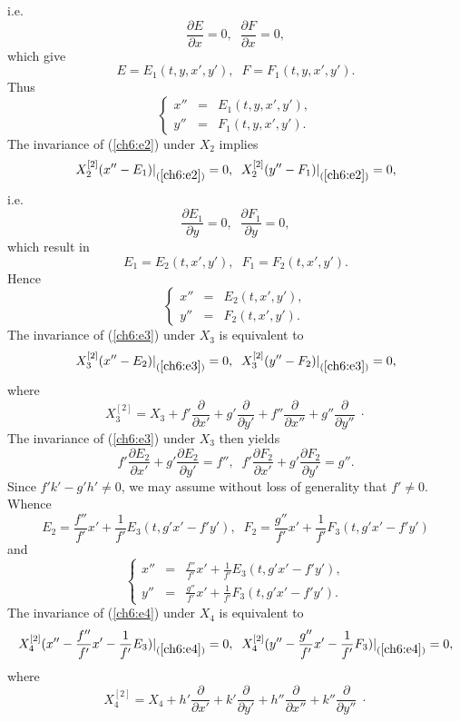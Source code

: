 i.e.
\[\frac{\partial E}{\partial x}=0,\;\;\frac{\partial F}{\partial x}=0,\]
which give
\[E=E_1(t,y,x',y'),\;\;F=F_1(t,y,x',y').\]
Thus
\begin{equation}
\label{ch6:e2}
\left \{ \begin{array}{ccc} x'' &=&E_1(t,y,x',y'),\\ y''&=&F_1(t,y,x',y'). 
\end{array} \right.
\end{equation}
The invariance of (\ref{ch6:e2}) under $X_2$ implies
\[X_2^{[2]}(x''-E_1)|_{(\ref{ch6:e2})}=0,\;\;X_2^{[2]}(y''-F_1)|_{(\ref{ch6:e2})}=0,\]
i.e.
\[\frac{\partial E_1}{\partial y}=0,\;\;\frac{\partial F_1}{\partial y}=0,\] 
which result in
\[E_1=E_2(t,x',y'),\;\;F_1=F_2(t,x',y').\]
Hence
\begin{equation}
\label{ch6:e3}
\left \{ \begin{array}{ccc} x'' &=&E_2(t,x',y'), \\ y''&=&F_2(t,x',y'). 
\end{array} \right.
\end{equation}
The invariance of (\ref{ch6:e3}) under $X_3$ is equivalent to
\[X_3^{[2]}(x''-E_2)|_{(\ref{ch6:e3})}=0,\;\;X_3^{[2]}(y''-F_2)|_{(\ref{ch6:e3})}=0,\]
where
\[X_3^{[2]}=X_3+f'\frac{\partial}{\partial x'}+g'\frac{\partial}{\partial y'}
+f''\frac{\partial}{\partial x''}+g''\frac{\partial}{\partial y''}\;\cdot\]
The invariance of (\ref{ch6:e3}) under $X_3$ then yields
\[f'\frac{\partial E_2}{\partial x'}+g'\frac{\partial E_2}{\partial y'}=f'',\;\;
f'\frac{\partial F_2}{\partial x'}+g'\frac{\partial F_2}{\partial y'}=g''.\]
Since $f'k'-g'h'\ne 0$, we may assume without loss of generality that 
$f'\ne 0.$  Whence
\[E_2=\frac{f''}{f'}x'+\frac{1}{f'}E_3(t,g'x'-f'y'),\;\;
F_2=\frac{g''}{f'}x'+\frac{1}{f'}F_3(t,g'x'-f'y')\]
and
\begin{equation}
\label{ch6:e4}
\left \{ \begin{array}{ccc}
x'' & = & \displaystyle{\frac{f''}{f'}x'+\frac{1}{f'}E_3(t,g'x'-f'y')},\\
y'' & = & \displaystyle{\frac{g''}{f'}x'+\frac{1}{f'}F_3(t,g'x'-f'y')}.
\end{array}\right.
\end{equation}
The invariance of (\ref{ch6:e4}) under $X_4$ is equivalent to 
\[
X_4^{[2]}(x''-\frac{f''}{f'}x'-\frac{1}{f'}E_3)|_{(\ref{ch6:e4})}=0,\;\;
X_4^{[2]}(y''-\frac{g''}{f'}x'-\frac{1}{f'}F_3)|_{(\ref{ch6:e4})}=0,\]
where
\[X_4^{[2]}=X_4+h'\frac{\partial}{\partial x'}+k'\frac{\partial}{\partial y'}
+h''\frac{\partial}{\partial x''}+k''\frac{\partial}{\partial y''}\;\cdot\]
